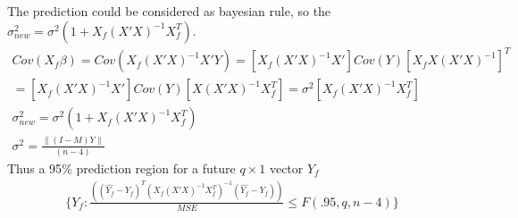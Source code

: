 \begin{itemize}
    The prediction could be considered as bayesian rule, so the $\sigma_{new}^2 = \sigma^2 (1+ X_f(X'X)^{-1}X_f^T)$.\\
     \[ 
    \begin{split}
    Cov(X_f \beta) = Cov(X_f (X'X)^{-1}X'Y) = [X_f (X'X)^{-1}X'] Cov(Y) [X_f X(X'X)^{-1}]^T\\
    = [X_f (X'X)^{-1}X'] Cov(Y) [X(X'X)^{-1} X_f^{T}] = \sigma^2[X_f (X'X)^{-1} X_f^T]\\
    \sigma_{new}^2 = \sigma^2 (1+ X_f(X'X)^{-1}X_f^T)\\
    \sigma^2 = \frac{\lVert (I-M)Y \rVert}{(n-4)}
    \end{split}
    \]     
    Thus a 95$\%$ prediction region for a future  $q \times 1$ vector $Y_f$\\
     \[ 
    \begin{split}
    \{ Y_f: \frac{((\hat{Y_f}-Y_f)^T (X_f (X'X)^{-1} X_f^T)^{-1} (\hat{Y_f}-Y_f))}{MSE} \leq F(.95, q, n-4) \}
    \end{split}
    \]     
\end{itemize}
